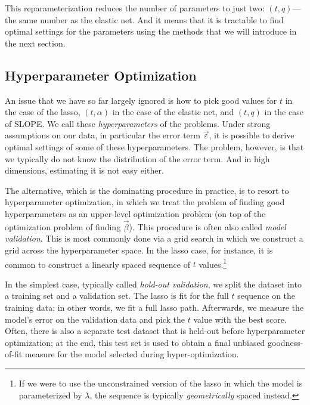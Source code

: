 This reparameterization reduces the number of parameters to just two: \((t,q)\)---the same number as the elastic net. And it means that it is tractable to find optimal settings for the parameters using the methods that we will introduce in the next section.

\subsection{Hyperparameter Optimization}

An issue that we have so far largely ignored is how to pick good values for \(t\) in the case of the lasso, \((t,\alpha)\) in the case of the elastic net, and \((t, q)\) in the case of SLOPE. We call these \emph{hyperparameters} of the problems. Under strong assumptions on our data, in particular the error term \(\vec{\varepsilon}\), it is possible to derive optimal settings of some of these hyperparameters. The problem, however, is that we typically do not know the distribution of the error term. And in high dimensions, estimating it is not easy either.

The alternative, which is the dominating procedure in practice, is to resort to hyperparameter optimization, in which we treat the problem of finding good hyperparameters as an upper-level optimization problem (on top of the optimization problem of finding \(\vec{\beta}\)). This procedure is often also called \emph{model validation}. This is most commonly done via a grid search in which we construct a grid across the hyperparameter space. In the lasso case, for instance, it is common to construct a linearly spaced sequence of \(t\) values.\footnote{If we were to use the unconstrained version of the lasso in which the model is parameterized by \(\lambda\), the sequence is typically \emph{geometrically} spaced instead.}

In the simplest case, typically called \emph{hold-out validation}, we split the dataset into a training set and a validation set. The lasso is fit for the full \(t\) sequence on the training data; in other words, we fit a full lasso path. Afterwards, we measure the model's error on the validation data and pick the \(t\) value with the best score. Often, there is also a separate test dataset that is held-out before hyperparameter optimization; at the end, this test set is used to obtain a final unbiased goodness-of-fit measure for the model selected during hyper-optimization.

